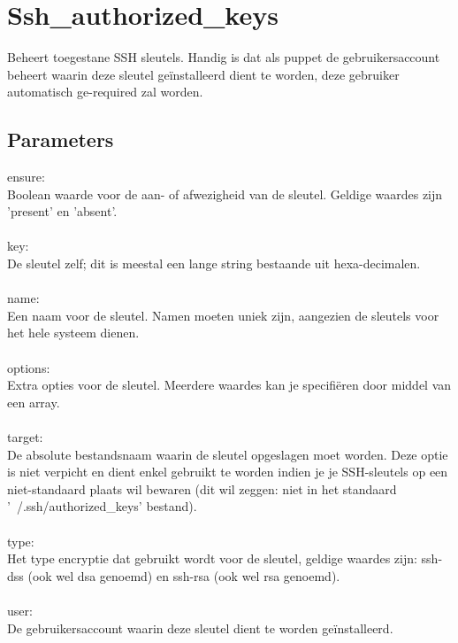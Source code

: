\section{Ssh\_authorized\_keys}

Beheert toegestane SSH sleutels. Handig is dat als puppet de gebruikersaccount beheert waarin deze sleutel ge\"installeerd dient te worden, deze gebruiker automatisch ge-required zal worden.

\subsection{Parameters}

ensure:\\
Boolean waarde voor de aan- of afwezigheid van de sleutel. Geldige waardes zijn 'present' en 'absent'.\\\\
%
key:\\
De sleutel zelf; dit is meestal een lange string bestaande uit hexa-decimalen.\\\\
%
name:\\
Een naam voor de sleutel. Namen moeten uniek zijn, aangezien de sleutels voor het hele systeem dienen.\\\\
%
options:\\
Extra opties voor de sleutel. Meerdere waardes kan je specifi\"eren door middel van een array.\\\\
%
target:\\
De absolute bestandsnaam waarin de sleutel opgeslagen moet worden. Deze optie is niet verpicht en dient enkel gebruikt te worden indien je je SSH-sleutels op een niet-standaard plaats wil bewaren (dit wil zeggen: niet in het standaard '~/.ssh/authorized\_keys' bestand).\\\\
%
type:\\
Het type encryptie dat gebruikt wordt voor de sleutel, geldige waardes zijn: ssh-dss (ook wel dsa genoemd) en ssh-rsa (ook wel rsa genoemd).\\\\
%
user:\\
De gebruikersaccount waarin deze sleutel dient te worden ge\"installeerd.\\\\
